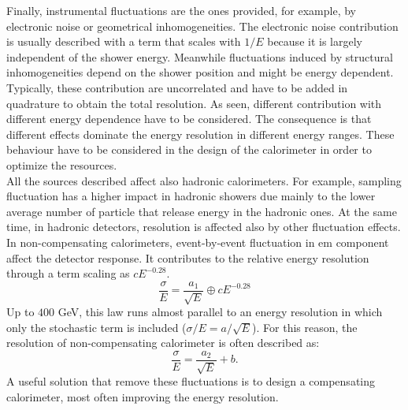 Finally, instrumental fluctuations are the ones provided, for example, by electronic noise or geometrical inhomogeneities. The electronic noise contribution is usually described with a term that scales with $1/E$ because it is largely independent of the shower energy. Meanwhile fluctuations induced by structural inhomogeneities depend on the shower position and might be energy dependent.\\
Typically, these contribution are uncorrelated and have to be added in quadrature to obtain the total resolution. As seen, different contribution with different energy dependence have to be considered. The consequence is that different effects dominate the energy resolution in different energy ranges. These behaviour have to be considered in the design of the calorimeter in order to optimize the resources.\\

All the sources described affect also hadronic calorimeters. For example, sampling fluctuation has a higher impact in hadronic showers due mainly to the lower average number of particle that release energy in the hadronic ones. 
At the same time, in hadronic detectors, resolution is affected also by other fluctuation effects.\\
In non-compensating calorimeters, event-by-event fluctuation in em component affect the detector response. It contributes to the relative energy resolution through a term scaling as $c E^{-0.28}$.
\begin{equation}
    \frac{\sigma}{E} = \frac{a_1}{\sqrt{E}} \oplus c E^{-0.28}
\end{equation}
Up to $400$ GeV, this law runs almost parallel to an energy resolution in which only the stochastic term is included ($\sigma/E = a/\sqrt{E}$). For this reason, the resolution of non-compensating calorimeter is often described as:
\begin{equation}
    \frac{\sigma}{E} = \frac{a_2}{\sqrt{E}} + b.
\end{equation}
A useful solution that remove these fluctuations is to design a compensating calorimeter, most often improving the energy resolution.\\

